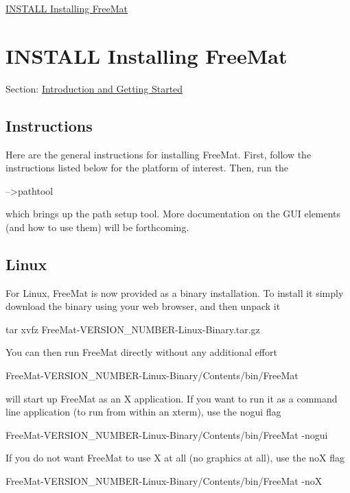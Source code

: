 
\begin{DoxyItemize}
\item \hyperlink{introduction_install}{I\-N\-S\-T\-A\-L\-L Installing Free\-Mat}  
\end{DoxyItemize}\hypertarget{introduction_install}{}\section{I\-N\-S\-T\-A\-L\-L Installing Free\-Mat}\label{introduction_install}
Section\-: \hyperlink{sec_introduction}{Introduction and Getting Started} \hypertarget{introduction_install_General}{}\subsection{Instructions}\label{introduction_install_General}
Here are the general instructions for installing Free\-Mat. First, follow the instructions listed below for the platform of interest. Then, run the \begin{DoxyVerb}-->pathtool
\end{DoxyVerb}
 which brings up the path setup tool. More documentation on the G\-U\-I elements (and how to use them) will be forthcoming. \hypertarget{introduction_install_Linux}{}\subsection{Linux}\label{introduction_install_Linux}
For Linux, Free\-Mat is now provided as a binary installation. To install it simply download the binary using your web browser, and then unpack it \begin{DoxyVerb}  tar xvfz FreeMat-\<VERSION_NUMBER\>-Linux-Binary.tar.gz
\end{DoxyVerb}
 You can then run Free\-Mat directly without any additional effort \begin{DoxyVerb}  FreeMat-\<VERSION_NUMBER\>-Linux-Binary/Contents/bin/FreeMat
\end{DoxyVerb}
 will start up Free\-Mat as an X application. If you want to run it as a command line application (to run from within an xterm), use the {\ttfamily nogui} flag \begin{DoxyVerb}  FreeMat-\<VERSION_NUMBER\>-Linux-Binary/Contents/bin/FreeMat -nogui
\end{DoxyVerb}
 If you do not want Free\-Mat to use X at all (no graphics at all), use the {\ttfamily no\-X} flag \begin{DoxyVerb}  FreeMat-\<VERSION_NUMBER\>-Linux-Binary/Contents/bin/FreeMat -noX
\end{DoxyVerb}
